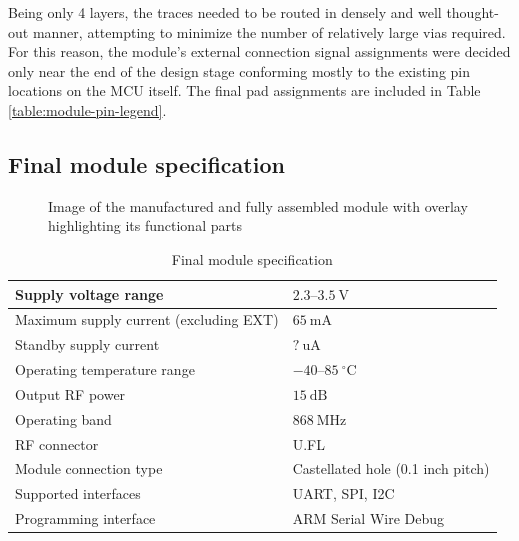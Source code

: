 Being only 4 layers, the traces needed to be routed in densely and well thought-out manner, attempting to minimize the number of relatively large vias required. For this reason, the module's external connection signal assignments were decided only near the end of the design stage conforming mostly to the existing pin locations on the MCU itself. The final pad assignments are included in Table \ref{table:module-pin-legend}.

\subsection{Final module specification}
\begin{figure}
    
    \caption{\label{fig:module-v0.1}Image of the manufactured and fully assembled module with overlay highlighting its functional parts}
\end{figure}

\begin{table}[H]
\begin{center}
\caption{\label{table:module-specification}Final module specification}
    \begin{tabular}{|l|l|} \hline
    Supply voltage range                    & $2.3\text{--}3.5~\mathrm{V}$\\ \hline
    Maximum supply current (excluding EXT)  & $65~\mathrm{mA}$\\ \hline
    Standby supply current                  & $?~\mathrm{uA}$\\ \hline
    Operating temperature range             & $-40\text{--}85~\mathrm{^\circ C}$\\ \hline
    Output RF power                         & $15~\mathrm{dB}$\\ \hline
    Operating band                          & $868~\mathrm{MHz}$\\ \hline
    RF connector                            & U.FL \\ \hline
    Module connection type                  & Castellated hole (0.1 inch pitch) \\ \hline
    Supported interfaces                    & UART, SPI, I2C \\ \hline
    Programming interface                   & ARM Serial Wire Debug \\ \hline
    \end{tabular}
\end{center}
\end{table}


